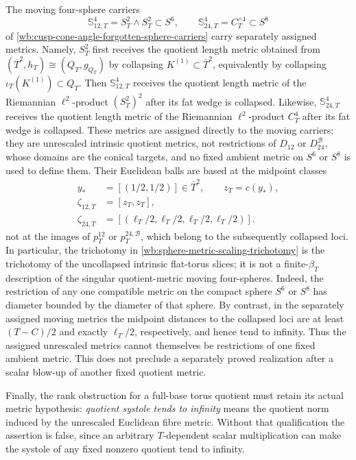 The moving four-sphere carriers
\[
 \mathbb S_{12,T}^4=S_T^2\wedge S_T^2\subset S^6,\qquad
 \mathbb S_{24,T}^4=C_T^{\wedge4}\subset S^8
\]
of \cref{wb:cusp-cone-angle-forgotten-sphere-carriers} carry separately
assigned metrics.  Namely, \(S_T^2\) first receives the quotient length
metric obtained from
\((\overline T^2,h_T)\cong(Q_T,g_{Q_T})\) by collapsing
\(K^{(1)}\subset\overline T^2\), equivalently by collapsing
\(\iota_T(K^{(1)})\subset Q_T\).  Then
\(\mathbb S_{12,T}^4\) receives the quotient length metric of the
Riemannian \(\ell^2\)-product \((S_T^2)^2\) after its fat wedge is
collapsed.  Likewise, \(\mathbb S_{24,T}^4\) receives the quotient length
metric of the Riemannian \(\ell^2\)-product \(C_T^4\) after its fat wedge is
collapsed.  These metrics are assigned directly to the moving carriers;
they are unrescaled intrinsic quotient metrics, not restrictions of
\(D_{12}\) or \(D_{24}^{\mathcal B}\), whose domains are the conical
targets, and no fixed ambient metric on \(S^6\) or \(S^8\) is used to
define them.  Their Euclidean balls are
based at the midpoint classes
\[
 \begin{aligned}
  y_*&=[(1/2,1/2)]\in\overline T^2,\qquad z_T=c(y_*),\\
  \zeta_{12,T}&=[z_T,z_T],\\
  \zeta_{24,T}
  &=[(\ell_T/2,\ell_T/2,\ell_T/2,\ell_T/2)].
 \end{aligned}
\]
not at the images of \(p_T^{12}\) or \(p_T^{24,\mathcal B}\), which belong
to the subsequently collapsed loci.  In particular, the trichotomy in
\cref{wb:sphere-metric-scaling-trichotomy} is the trichotomy of the
uncollapsed intrinsic flat-torus slices; it is not a finite-\(\beta_T\)
description of the singular quotient-metric moving four-spheres.  Indeed,
the restriction of any one compatible metric on the compact sphere
\(S^6\) or \(S^8\) has diameter bounded by the diameter of that sphere.  By
contrast, in the separately assigned moving metrics the midpoint distances
to the collapsed loci are at least \((T-C)/2\) and exactly
\(\ell_T/2\), respectively, and hence tend to infinity.  Thus the assigned
unrescaled metrics cannot themselves be restrictions of one fixed ambient
metric.  This does not preclude a separately proved realization after a
scalar blow-up of another fixed quotient metric.

Finally, the rank obstruction for a full-base torus quotient must retain
its actual metric hypothesis: \emph{quotient systole tends to infinity}
means the quotient norm induced by the unrescaled Euclidean fibre metric.
Without that qualification the assertion is false, since an arbitrary
\(T\)-dependent scalar multiplication can make the systole of any fixed
nonzero quotient tend to infinity.

